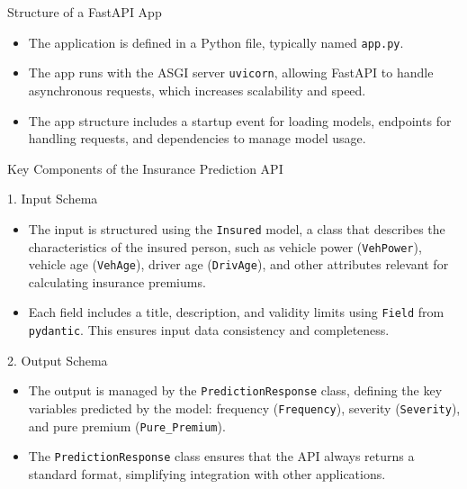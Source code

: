 \documentclass[
  ignorenonframetext,
]{beamer}
\providecommand{\tightlist}{%
  \setlength{\itemsep}{0pt}\setlength{\parskip}{0pt}}
\begin{document}
\begin{frame}[fragile]
\begin{block}{Structure of a FastAPI App}
\label{structure-of-a-fastapi-app}
\begin{itemize}
\tightlist
\item
  The application is defined in a Python file, typically named
  \texttt{app.py}.
\item
  The app runs with the ASGI server \texttt{uvicorn}, allowing FastAPI
  to handle asynchronous requests, which increases scalability and
  speed.
\item
  The app structure includes a startup event for loading models,
  endpoints for handling requests, and dependencies to manage model
  usage.
\end{itemize}
\end{block}
\end{frame}

\begin{frame}[fragile]
\begin{block}{Key Components of the Insurance Prediction API}
\label{key-components-of-the-insurance-prediction-api}
\begin{block}{1. Input Schema}
\label{input-schema}
\begin{itemize}
\tightlist
\item
  The input is structured using the \texttt{Insured} model, a class that
  describes the characteristics of the insured person, such as vehicle
  power (\texttt{VehPower}), vehicle age (\texttt{VehAge}), driver age
  (\texttt{DrivAge}), and other attributes relevant for calculating
  insurance premiums.
\item
  Each field includes a title, description, and validity limits using
  \texttt{Field} from \texttt{pydantic}. This ensures input data
  consistency and completeness.
\end{itemize}
\end{block}
\end{block}
\end{frame}

\begin{frame}[fragile]
\begin{block}{2. Output Schema}
\label{output-schema}
\begin{itemize}
\tightlist
\item
  The output is managed by the \texttt{PredictionResponse} class,
  defining the key variables predicted by the model: frequency
  (\texttt{Frequency}), severity (\texttt{Severity}), and pure premium
  (\texttt{Pure\_Premium}).
\item
  The \texttt{PredictionResponse} class ensures that the API always
  returns a standard format, simplifying integration with other
  applications.
\end{itemize}
\end{block}
\end{frame}
\end{document}
